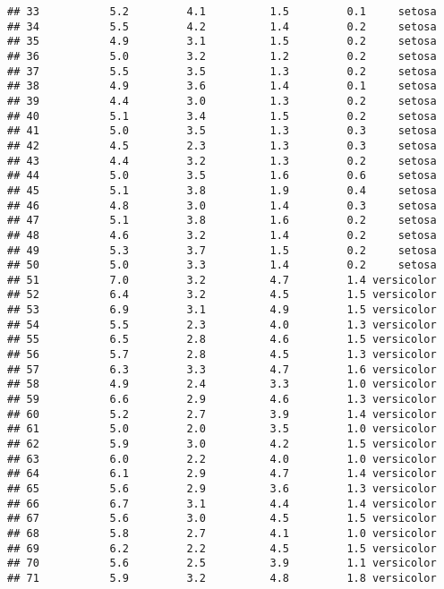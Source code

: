\documentclass[]{article}
\begin{document}
\begin{verbatim}
## 33           5.2         4.1          1.5         0.1     setosa
## 34           5.5         4.2          1.4         0.2     setosa
## 35           4.9         3.1          1.5         0.2     setosa
## 36           5.0         3.2          1.2         0.2     setosa
## 37           5.5         3.5          1.3         0.2     setosa
## 38           4.9         3.6          1.4         0.1     setosa
## 39           4.4         3.0          1.3         0.2     setosa
## 40           5.1         3.4          1.5         0.2     setosa
## 41           5.0         3.5          1.3         0.3     setosa
## 42           4.5         2.3          1.3         0.3     setosa
## 43           4.4         3.2          1.3         0.2     setosa
## 44           5.0         3.5          1.6         0.6     setosa
## 45           5.1         3.8          1.9         0.4     setosa
## 46           4.8         3.0          1.4         0.3     setosa
## 47           5.1         3.8          1.6         0.2     setosa
## 48           4.6         3.2          1.4         0.2     setosa
## 49           5.3         3.7          1.5         0.2     setosa
## 50           5.0         3.3          1.4         0.2     setosa
## 51           7.0         3.2          4.7         1.4 versicolor
## 52           6.4         3.2          4.5         1.5 versicolor
## 53           6.9         3.1          4.9         1.5 versicolor
## 54           5.5         2.3          4.0         1.3 versicolor
## 55           6.5         2.8          4.6         1.5 versicolor
## 56           5.7         2.8          4.5         1.3 versicolor
## 57           6.3         3.3          4.7         1.6 versicolor
## 58           4.9         2.4          3.3         1.0 versicolor
## 59           6.6         2.9          4.6         1.3 versicolor
## 60           5.2         2.7          3.9         1.4 versicolor
## 61           5.0         2.0          3.5         1.0 versicolor
## 62           5.9         3.0          4.2         1.5 versicolor
## 63           6.0         2.2          4.0         1.0 versicolor
## 64           6.1         2.9          4.7         1.4 versicolor
## 65           5.6         2.9          3.6         1.3 versicolor
## 66           6.7         3.1          4.4         1.4 versicolor
## 67           5.6         3.0          4.5         1.5 versicolor
## 68           5.8         2.7          4.1         1.0 versicolor
## 69           6.2         2.2          4.5         1.5 versicolor
## 70           5.6         2.5          3.9         1.1 versicolor
## 71           5.9         3.2          4.8         1.8 versicolor

\end{verbatim}
\end{document}
